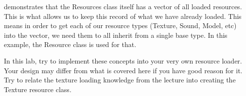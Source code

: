 \documentclass[10pt]{article}
\begin{document}

 demonstrates that the Resources class itself has a vector of all loaded resources.
This is what allows us to keep this record of what we have already loaded. This means in order to get each of our resource types
(Texture, Sound, Model, etc) into the vector, we need them to all inherit from a single base type. In this example, the Resource class is used for that.


In this lab, try to implement these concepts into your very own resource
loader. Your design may differ from what is covered here if you have
good reason for it.  Try to relate the texture loading knowledge from
the lecture into creating the Texture resource class.
\end{document}
